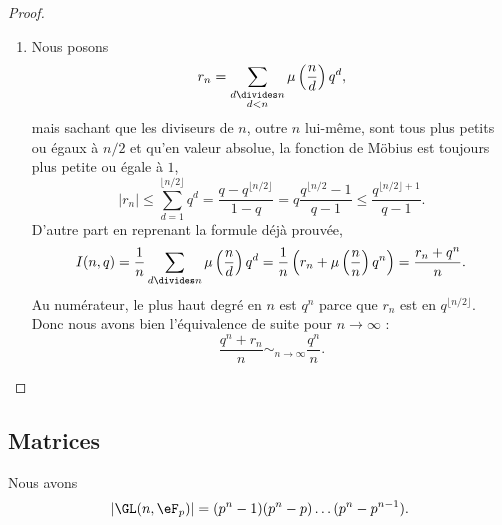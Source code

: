 \begin{proof}
\begin{enumerate}
		\item
		      Nous posons
		      \begin{equation}
			      r_n=\sum_{\substack{d\divides n\\d<n}}\mu\left( \frac{ n }{ d } \right)q^d,
		      \end{equation}
		      mais sachant que les diviseurs de \( n\), outre \( n\) lui-même, sont tous plus petits ou égaux à \( n/2\) et qu'en valeur absolue, la fonction de Möbius est toujours plus petite ou égale à \( 1\),
		      \begin{equation}
			      | r_n |\leq\sum_{d=1}^{\lfloor n/2\rfloor}q^d=\frac{ q-q^{\lfloor n/2\rfloor} }{ 1-q }=q\frac{ q^{\lfloor n/2}-1 }{ q-1 }\leq \frac{ q^{\lfloor n/2 \rfloor+1} }{ q-1 }.
		      \end{equation}
		      D'autre part en reprenant la formule déjà prouvée,
		      \begin{equation}
			      I(n,q)=\frac{1}{ n }\sum_{d\divides n}\mu\left( \frac{ n }{ d } \right)q^d=\frac{1}{ n }\left( r_n+\mu\left( \frac{ n }{ n } \right)q^n \right)=\frac{ r_n+q^n }{ n }.
		      \end{equation}
		      Au numérateur, le plus haut degré en \( n\) est \( q^n\) parce que \( r_n\) est en \( q^{\lfloor n/2\rfloor}\). Donc nous avons bien l'équivalence de suite pour \( n\to \infty\) :
		      \begin{equation}
			      \frac{ q^n+r_n }{ n }\sim_{n\to\infty}\frac{ q^n }{ n }.
		      \end{equation}
	\end{enumerate}
\end{proof}

\subsection{Matrices}

\begin{proposition}
	Nous avons
	\begin{equation}
		| \GL(n,\eF_p) |=(p^n-1)(p^n-p)\ldots (p^n-p^{n-1}).
	\end{equation}
\end{proposition}

